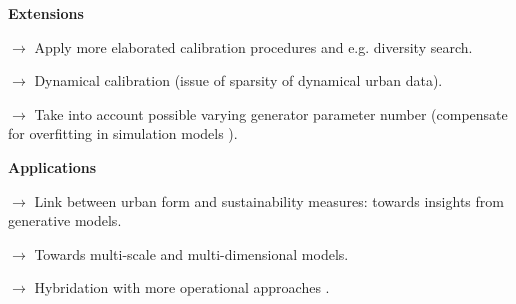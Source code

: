 \documentclass[english,11pt]{beamer}
\begin{document}
{%
%

\justify

\vspace{-1cm}

\textbf{Extensions}

\medskip

$\rightarrow$ Apply more elaborated calibration procedures and e.g. diversity search.

\smallskip

$\rightarrow$ Dynamical calibration (issue of sparsity of dynamical urban data).

\smallskip

$\rightarrow$ Take into account possible varying generator parameter number (compensate for overfitting in simulation models \cite{piou2009proposing}).

\bigskip
\bigskip

\textbf{Applications}

\medskip

$\rightarrow$ Link between urban form and sustainability measures: towards insights from generative models.

\smallskip

$\rightarrow$ Towards multi-scale and multi-dimensional models.

\smallskip

$\rightarrow$ Hybridation with more operational approaches \cite{brasebin2017apports}.


}
\end{document}
